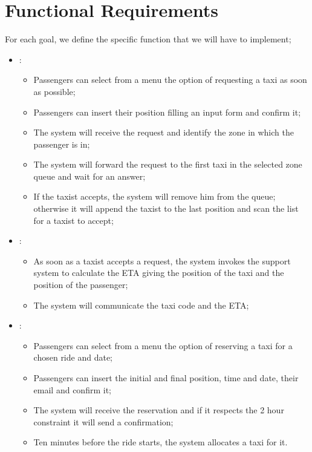 \section { Functional Requirements}
 
For each goal, we define the specific function that we will have to implement;\\
\begin {itemize}
\item [G1]:
	\begin{itemize}
	\item Passengers can select from a menu the option of requesting a taxi as soon as possible; 
	\item Passengers can insert their position filling an input form and confirm it;
	\item The system will receive the request and identify the zone in which the passenger is in;
	\item The system will forward the request to the first taxi in the selected zone queue and wait for an answer;
	\item If the taxist accepts, the system will remove him from the queue; otherwise it will append the taxist to the last position and
scan the list for a taxist to accept;
	\end{itemize}
\item [G2]:
	\begin{itemize}
	\item As soon as a taxist accepts a request, the system invokes the support system to calculate the ETA giving the position of the taxi and the position of the passenger;
	\item The system will communicate the taxi code and the ETA;
	\end{itemize}
\item [G3]:
	\begin{itemize}
	\item Passengers can select from a menu the option of reserving a taxi for a chosen ride and date; 
	\item Passengers can insert the initial and final position, time and date, their email and confirm it;%
	\item The system will receive the reservation and if it respects the 2 hour constraint it will send a confirmation;
	\item Ten minutes before the ride starts, the system allocates a taxi for it.

\end{itemize}
\end{itemize}
